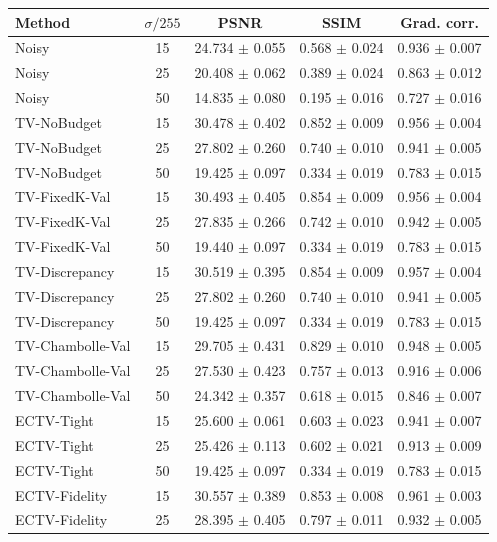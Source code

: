 \begin{tabular}{lcccc}
\toprule
Method & $\sigma/255$ & PSNR & SSIM & Grad. corr. \\
\midrule
Noisy & 15 & 24.734 $\pm$ 0.055 & 0.568 $\pm$ 0.024 & 0.936 $\pm$ 0.007 \\
Noisy & 25 & 20.408 $\pm$ 0.062 & 0.389 $\pm$ 0.024 & 0.863 $\pm$ 0.012 \\
Noisy & 50 & 14.835 $\pm$ 0.080 & 0.195 $\pm$ 0.016 & 0.727 $\pm$ 0.016 \\
TV-NoBudget & 15 & 30.478 $\pm$ 0.402 & 0.852 $\pm$ 0.009 & 0.956 $\pm$ 0.004 \\
TV-NoBudget & 25 & 27.802 $\pm$ 0.260 & 0.740 $\pm$ 0.010 & 0.941 $\pm$ 0.005 \\
TV-NoBudget & 50 & 19.425 $\pm$ 0.097 & 0.334 $\pm$ 0.019 & 0.783 $\pm$ 0.015 \\
TV-FixedK-Val & 15 & 30.493 $\pm$ 0.405 & 0.854 $\pm$ 0.009 & 0.956 $\pm$ 0.004 \\
TV-FixedK-Val & 25 & 27.835 $\pm$ 0.266 & 0.742 $\pm$ 0.010 & 0.942 $\pm$ 0.005 \\
TV-FixedK-Val & 50 & 19.440 $\pm$ 0.097 & 0.334 $\pm$ 0.019 & 0.783 $\pm$ 0.015 \\
TV-Discrepancy & 15 & 30.519 $\pm$ 0.395 & 0.854 $\pm$ 0.009 & 0.957 $\pm$ 0.004 \\
TV-Discrepancy & 25 & 27.802 $\pm$ 0.260 & 0.740 $\pm$ 0.010 & 0.941 $\pm$ 0.005 \\
TV-Discrepancy & 50 & 19.425 $\pm$ 0.097 & 0.334 $\pm$ 0.019 & 0.783 $\pm$ 0.015 \\
TV-Chambolle-Val & 15 & 29.705 $\pm$ 0.431 & 0.829 $\pm$ 0.010 & 0.948 $\pm$ 0.005 \\
TV-Chambolle-Val & 25 & 27.530 $\pm$ 0.423 & 0.757 $\pm$ 0.013 & 0.916 $\pm$ 0.006 \\
TV-Chambolle-Val & 50 & 24.342 $\pm$ 0.357 & 0.618 $\pm$ 0.015 & 0.846 $\pm$ 0.007 \\
ECTV-Tight & 15 & 25.600 $\pm$ 0.061 & 0.603 $\pm$ 0.023 & 0.941 $\pm$ 0.007 \\
ECTV-Tight & 25 & 25.426 $\pm$ 0.113 & 0.602 $\pm$ 0.021 & 0.913 $\pm$ 0.009 \\
ECTV-Tight & 50 & 19.425 $\pm$ 0.097 & 0.334 $\pm$ 0.019 & 0.783 $\pm$ 0.015 \\
ECTV-Fidelity & 15 & 30.557 $\pm$ 0.389 & 0.853 $\pm$ 0.008 & 0.961 $\pm$ 0.003 \\
ECTV-Fidelity & 25 & 28.395 $\pm$ 0.405 & 0.797 $\pm$ 0.011 & 0.932 $\pm$ 0.005 \\

\end{tabular}
